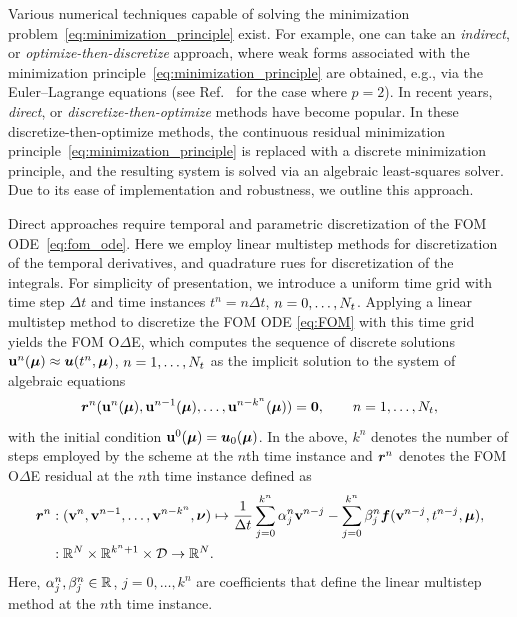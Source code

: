 \documentclass[3p,computermodern,10pt]{elsarticle}
\begin{document}
Various numerical techniques capable of solving the minimization problem~\eqref{eq:minimization_principle} exist. For example, one can take an \textit{indirect}, or \textit{optimize-then-discretize} approach, where weak forms associated with the minimization principle~\eqref{eq:minimization_principle} are obtained, e.g., via the Euler--Lagrange equations (see Ref.~\cite{parish_wls} for the case where $p=2$). In recent years, \textit{direct}, or \textit{discretize-then-optimize} methods have become popular. In these discretize-then-optimize methods, the continuous residual minimization principle~\eqref{eq:minimization_principle} is replaced with a discrete minimization principle, and the resulting system is solved via an algebraic least-squares solver. Due to its ease of implementation and robustness, we outline this approach. 

Direct approaches require temporal and parametric discretization of the FOM ODE~\eqref{eq:fom_ode}. Here we employ linear multistep methods for discretization of the temporal derivatives, and quadrature rues for discretization of the integrals. For simplicity of presentation, we introduce a uniform time
grid with time step $\Delta t$ and time instances
$t^n = n\Delta
t$, $n=0,\ldots,N_t$. 
Applying a linear multistep method to discretize the FOM ODE \eqref{eq:FOM}
with this time grid
yields the FOM O$\Delta$E, which computes the sequence of discrete
solutions
$\mathbf{u}^n(\boldsymbol \mu) \approx \boldsymbol u(t^n,\boldsymbol \mu)$, $n=1,\ldots,N_t$
as the implicit solution to the system of algebraic equations
\begin{equation}\label{eq:lms}
\boldsymbol{r}^n
	(\mathbf{u}^n(\boldsymbol \mu),\mathbf{u}^{n-1}(\boldsymbol \mu),\ldots,\mathbf{u}^{n-k^n}(\boldsymbol \mu))
	= \boldsymbol 0,\qquad n=1,\ldots,N_t,
\end{equation}
with the initial condition $\mathbf{u}^0(\boldsymbol \mu) =\boldsymbol u_0(\boldsymbol \mu)$. In the above, $k^n$ denotes the number of steps employed by the scheme at the $n$th
time instance and 
$\boldsymbol{r}^n$ denotes the FOM O$\Delta$E residual at the $n$th time instance defined as
\begin{align*}
\boldsymbol{r}^n &: (\mathbf{v}^n,\mathbf{v}^{n-1},\ldots,\mathbf{v}^{n-k^n},\boldsymbol \nu) \mapsto  \frac{1}{\Delta t} \sum_{j=0}^{k^n} \alpha^n_j \mathbf{v}^{n-j} -  \sum_{j=0}^{k^n} \beta^n_j \boldsymbol f(\mathbf{v}^{n-j},t^{n-j},\boldsymbol \mu),
\\
&: \mathbb{R}^{N} \times \mathbb{R}^{k^n + 1} \times \mathcal{D} \rightarrow \mathbb{R}^{N}.
\end{align*} 
Here, $\alpha^n_j,\beta^n_j\in\mathbb{R}^{}$, $j=0,\ldots,k^n$ are coefficients
that define the linear multistep method at the $n$th time instance.
 
\end{document}
